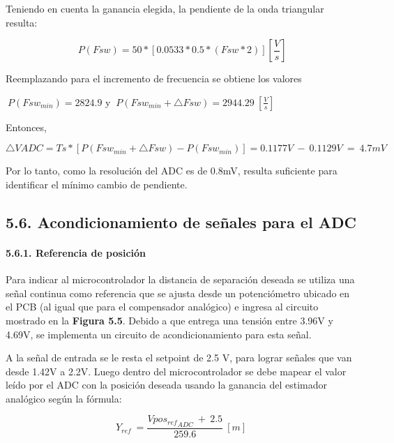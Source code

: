 \documentclass{article} %
\begin{document}
\noindent 

\noindent Teniendo en cuenta la ganancia elegida,  la pendiente de la onda triangular resulta:

\noindent 
\[\ P(Fsw)=50*[0.0533*0.5*(Fsw*2)][\frac{V}{s}]\] 


\noindent Reemplazando para el incremento de frecuencia se obtiene los valores 

\noindent 

\noindent $\ P({Fsw}_{min})=2824.9$ y $\ P({Fsw}_{min}+\triangle Fsw)=2944.29\ [\frac{V}{s}]$           

\noindent 

\noindent Entonces, 

\noindent 
\[\triangle VADC=Ts*[P({Fsw}_{min}+\triangle Fsw)-P({Fsw}_{min})]=0.1177V\ -\ 0.1129V\ =\ 4.7mV\] 


\noindent Por lo tanto, como la resoluci\'{o}n del ADC es de 0.8mV, resulta suficiente para identificar el m\'{i}nimo cambio de pendiente.

\noindent 
\subsection{5.6. Acondicionamiento de se\~{n}ales para el ADC}

\noindent 
\paragraph{5.6.1. Referencia de posici\'{o}n}

\noindent 

\noindent Para indicar al microcontrolador la distancia de separaci\'{o}n deseada se utiliza una se\~{n}al continua como referencia que se ajusta desde un potenci\'{o}metro ubicado en el PCB (al igual que para el compensador anal\'{o}gico) e ingresa al circuito mostrado en la \textbf{Figura 5.5}. Debido a que entrega una tensi\'{o}n entre 3.96V y 4.69V, se implementa un circuito de acondicionamiento para esta se\~{n}al.

\noindent 

\noindent A la se\~{n}al de entrada se le resta el setpoint de 2.5 V, para lograr se\~{n}ales que van desde 1.42V a 2.2V. Luego dentro del microcontrolador se debe mapear el valor le\'{i}do por el ADC con la posici\'{o}n deseada usando la ganancia del estimador anal\'{o}gico seg\'{u}n la f\'{o}rmula:

\noindent 
\[Y_{ref}\ =\frac{Vpo{s_{ref}}_{ADC}\ +\ 2.5}{259.6}\ [m]\] 
\end{document}
